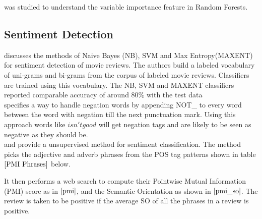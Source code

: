 \documentclass[twoside,12pt]{article}
\begin{document}
\cite{robin_jean} was studied to understand the variable importance feature in Random Forests.


\subsection{Sentiment Detection}

\cite{pang_2002} discusses the methods of Naive Bayes (NB), SVM and Max Entropy(MAXENT) for sentiment detection of movie reviews. The authors build a labeled vocabulary of uni-grams and bi-grams from the corpus of labeled movie reviews. Classifiers are trained using this  vocabulary. The NB, SVM and MAXENT classifiers reported comparable accuracy of around $80\%$ with the test data\\

\cite{das_2001} specifies a way to handle negation words by appending  NOT\_ to every word between the word with negation till the next punctuation mark. Using this approach words like $isn't good$ will get negation tags and are likely to be seen as negative as they should be.\\

\cite{turney_2002} and \cite{turney_littman_2002} provide a unsupervised method for sentiment classification. The method picks the adjective and adverb phrases from the POS tag patterns shown in table $\eqref{PMI Phrases}$ below.\\ 

\begin{table}[ht]
\centering
{}
\caption{Phrases to be extracted for PMI}
\label{PMI Phrases}
\end{table} 

It then performs a web search to compute their Pointwise Mutual Information (PMI) score as in $\eqref{pmi}$, and the Semantic Orientation as shown in $\eqref{pmi_so}$. The review is taken to be positive if the average SO of all the phrases in a review is positive. 
\end{document}
